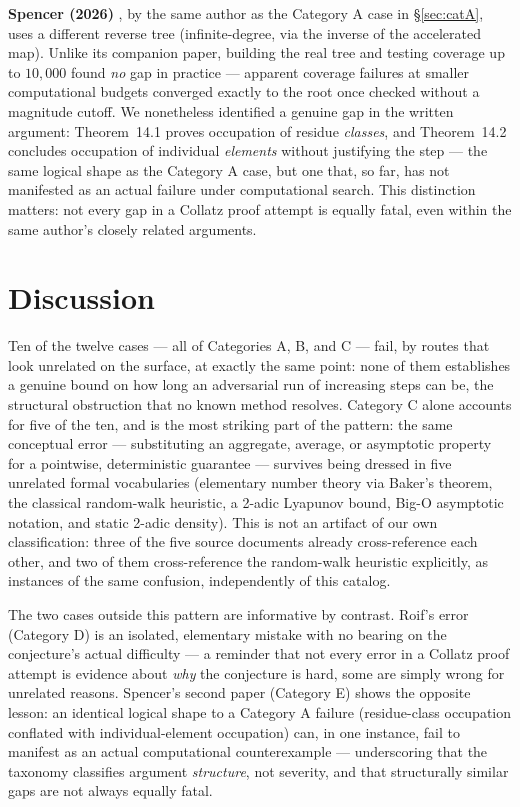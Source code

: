 \documentclass[11pt]{article}
\begin{document}
\textbf{Spencer (2026)} \cite{Spencer2025b}, by the same author as the
Category A case in \S\ref{sec:catA}, uses a different reverse tree
(infinite-degree, via the inverse of the accelerated map). Unlike its
companion paper, building the real tree and testing coverage up to
\(10{,}000\) found \emph{no} gap in practice --- apparent coverage
failures at smaller computational budgets converged exactly to the
root once checked without a magnitude cutoff. We nonetheless identified
a genuine gap in the written argument: Theorem~14.1 proves occupation
of residue \emph{classes}, and Theorem~14.2 concludes occupation of
individual \emph{elements} without justifying the step --- the same
logical shape as the Category A case, but one that, so far, has not
manifested as an actual failure under computational search. This
distinction matters: not every gap in a Collatz proof attempt is
equally fatal, even within the same author's closely related
arguments.

\section{Discussion}
\label{sec:discussion}

Ten of the twelve cases --- all of Categories A, B, and C --- fail, by
routes that look unrelated on the surface, at exactly the same point:
none of them establishes a genuine bound on how long an adversarial run
of increasing steps can be, the structural obstruction that no known
method resolves. Category C alone accounts for five of the ten, and is
the most striking part of the pattern: the same conceptual error ---
substituting an aggregate, average, or asymptotic property for a
pointwise, deterministic guarantee --- survives being dressed in five
unrelated formal vocabularies (elementary number theory via Baker's
theorem, the classical random-walk heuristic, a 2-adic Lyapunov bound,
Big-O asymptotic notation, and static 2-adic density). This is not an
artifact of our own classification: three of the five source documents
already cross-reference each other, and two of them cross-reference the
random-walk heuristic explicitly, as instances of the same confusion,
independently of this catalog.

The two cases outside this pattern are informative by contrast. Roif's
error (Category D) is an isolated, elementary mistake with no bearing
on the conjecture's actual difficulty --- a reminder that not every
error in a Collatz proof attempt is evidence about \emph{why} the
conjecture is hard, some are simply wrong for unrelated reasons.
Spencer's second paper (Category E) shows the opposite lesson: an
identical logical shape to a Category A failure (residue-class
occupation conflated with individual-element occupation) can, in one
instance, fail to manifest as an actual computational counterexample
--- underscoring that the taxonomy classifies argument \emph{structure},
not severity, and that structurally similar gaps are not always equally
fatal.
\end{document}
